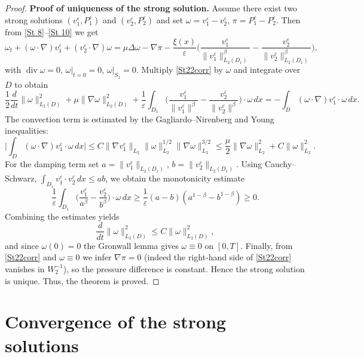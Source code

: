 \documentclass[11pt]{article}
\begin{document}
\begin{proof}
\textbf{Proof of uniqueness of the strong solution.} Assume there exist two strong solutions $(v_1^\varepsilon,P_1^\varepsilon)$ and $(v_2^\varepsilon,P_2^\varepsilon)$ and set
$\omega=v_1^\varepsilon-v_2^\varepsilon$, $\pi=P_1^\varepsilon-P_2^\varepsilon$. Then from \eqref{St 8}--\eqref{St 10} we get
\begin{equation}\label{St22corr}
	\omega_t+(\omega\cdot\nabla)v_1^\varepsilon+(v_2^\varepsilon\cdot\nabla)\omega=\mu\Delta\omega-\nabla\pi
	-\frac{\xi(x)}{\varepsilon}\Big(\frac{v_1^\varepsilon}{\|v_1^\varepsilon\|_{L_2(D_1)}^\beta}-\frac{v_2^\varepsilon}{\|v_2^\varepsilon\|_{L_2(D_1)}^\beta}\Big),
\end{equation}
with $\operatorname{div}\omega=0$, $\omega|_{t=0}=0$, $\omega|_{S_1}=0$. Multiply \eqref{St22corr} by $\omega$ and integrate over $D$ to obtain
\[
\frac12\frac{d}{dt}\|\omega\|_{L_2(D)}^2+\mu\|\nabla\omega\|_{L_2(D)}^2
+\frac{1}{\varepsilon}\int_{D_1}\Big(\frac{v_1^\varepsilon}{\|v_1^\varepsilon\|^\beta}-\frac{v_2^\varepsilon}{\|v_2^\varepsilon\|^\beta}\Big)\!\cdot\omega\,dx
=-\int_D(\omega\cdot\nabla)v_1^\varepsilon\cdot\omega\,dx.
\]
The convection term is estimated by the Gagliardo--Nirenberg and Young inequalities:
\[
\Big|\int_D(\omega\cdot\nabla)v_1^\varepsilon\cdot\omega\,dx\Big|
\le C\|\nabla v_1^\varepsilon\|_{L_2}\|\omega\|_{L_2}^{1/2}\|\nabla\omega\|_{L_2}^{3/2}
\le\frac\mu2\|\nabla\omega\|_{L_2}^2 + C\|\omega\|_{L_2}^2.
\]
For the damping term set $a=\|v_1^\varepsilon\|_{L_2(D_1)}$, $b=\|v_2^\varepsilon\|_{L_2(D_1)}$. Using Cauchy--Schwarz,
$\int_{D_1}v_1^\varepsilon\cdot v_2^\varepsilon\,dx\le ab$, we obtain the monotonicity estimate
\[
\frac{1}{\varepsilon}\int_{D_1}\Big(\frac{v_1^\varepsilon}{a^\beta}-\frac{v_2^\varepsilon}{b^\beta}\Big)\cdot\omega\,dx
\ge\frac{1}{\varepsilon}(a-b)(a^{1-\beta}-b^{1-\beta})\ge0.
\]
Combining the estimates yields
\[
\frac{d}{dt}\|\omega\|_{L_2(D)}^2 \le C\|\omega\|_{L_2(D)}^2,
\]
and since $\omega(0)=0$ the Gronwall lemma gives $\omega\equiv0$ on $[0,T]$. Finally, from \eqref{St22corr} and $\omega\equiv0$ we infer $\nabla\pi=0$ (indeed the right-hand side of \eqref{St22corr} vanishes in $W^{-1}_2$), so the pressure difference is constant. Hence the strong solution is unique.
   Thus, the theorem is proved.
\end{proof}


\section{Convergence of the strong solutions} \label{S5}
\end{document}
